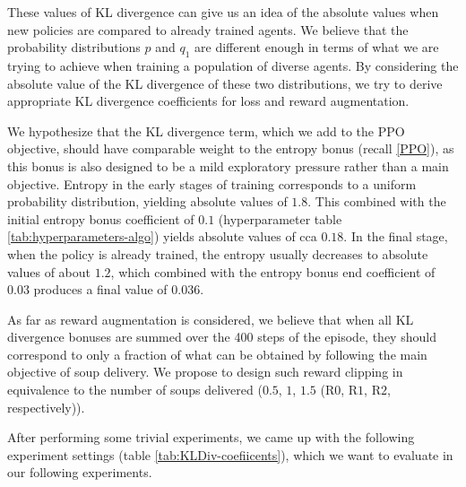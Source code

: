 These values of KL divergence can give us an idea of the absolute values when new policies are compared to already trained agents.
We believe that the probability distributions $p$ and $q_1$ are different enough in terms of what we are trying to achieve when training a population of diverse agents.
By considering the absolute value of the KL divergence of these two distributions, we try to derive appropriate KL divergence coefficients for loss and reward augmentation.

We hypothesize that the KL divergence term, which we add to the PPO objective, should have comparable weight to the entropy bonus (recall \ref{PPO}), as this bonus is also designed to be a mild exploratory pressure rather than a main objective.
Entropy in the early stages of training corresponds to a uniform probability distribution, yielding absolute values of $1.8$. 
This combined with the initial entropy bonus coefficient of $0.1$ (hyperparameter table \ref{tab:hyperparameters-algo}) yields absolute values of cca $0.18$.
In the final stage, when the policy is already trained, the entropy usually decreases to absolute values of about $1.2$, which combined with the entropy bonus end coefficient of $0.03$ produces a final value of $0.036$.

As far as reward augmentation is considered, we believe that when all KL divergence bonuses are summed over the 400 steps of the episode, they should correspond to only a fraction of what can be obtained by following the main objective of soup delivery.
We propose to design such reward clipping in equivalence to the number of soups delivered ($0.5$, $1$, $1.5$ (R$0$, R$1$, R$2$, respectively)).

After performing some trivial experiments, we came up with the following experiment settings (table \ref{tab:KLDiv-coefiicents}), which we want to evaluate in our following experiments.



